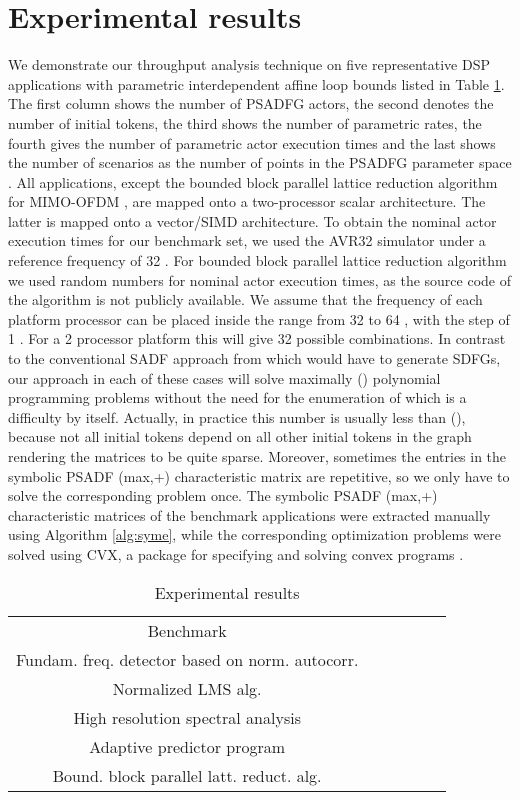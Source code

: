 \documentclass[]{eptcs}
\begin{document}
\section{Experimental results}
We demonstrate our throughput analysis technique on five representative DSP applications with parametric interdependent affine loop bounds listed in Table \ref{tabl:result}. The first column shows the number of PSADFG actors, the second denotes the number of initial tokens, the third shows the number of parametric rates, the fourth gives the number of parametric actor execution times and the last shows the number of scenarios as the number of points in the PSADFG parameter space . All applications, except the bounded block parallel lattice reduction algorithm for MIMO-OFDM \cite{2ahmad:all}, are mapped onto a two-processor scalar architecture. The latter is mapped onto a vector/SIMD architecture. To obtain the nominal actor execution times for our benchmark set, we used the AVR32 \cite{2avr} simulator under a reference frequency of 32 . For bounded block parallel lattice reduction algorithm \cite{2ahmad:all} we used random numbers for nominal actor execution times, as the source code of the algorithm is not publicly available. We assume that the frequency of each platform processor can be placed inside the range from 32 to 64 , with the step of 1 . For a 2 processor platform this will give 32 possible combinations. In contrast to the conventional SADF approach from \cite{2geil:all} which would have to generate  SDFGs, our approach in each of these cases will solve maximally () polynomial programming problems without the need for the enumeration  of  which is a difficulty by itself. Actually, in practice this number is usually less than (), because not all initial tokens depend on all other initial tokens in the graph rendering the matrices to be quite sparse. Moreover, sometimes the entries in the symbolic PSADF (max,+) characteristic matrix are repetitive, so we only have to solve the corresponding problem once. The symbolic PSADF (max,+) characteristic matrices of the benchmark applications were extracted manually using Algorithm \ref{alg:syme}, while the corresponding optimization problems were solved using CVX, a package for specifying and solving convex programs \cite{cvx}\cite{gb08}.
\begin{table}
\caption{Experimental results}
\begin{center}
\label{tabl:result}
\begin{tabular}{c|c|c|c|c|c}
\hline
\noalign{\smallskip}
Benchmark &  &  &  &  &  \\
\noalign{\smallskip}
\hline
Fundam. freq. detector based on norm. autocorr. \cite{2icts:all} &  &  &  &  &  \\
Normalized LMS alg. \cite{2icts:all} &  &  &  &  & \\
High resolution spectral analysis \cite{2icts:all} &  &  &  &  & \\
Adaptive predictor program \cite{2chass} &  &  &  &  & \\
Bound. block parallel latt. reduct. alg. \cite{2ahmad:all} &  &  &  &  &  \\
\hline
\end{tabular}
\end{center}
\end{table}
\end{document}
